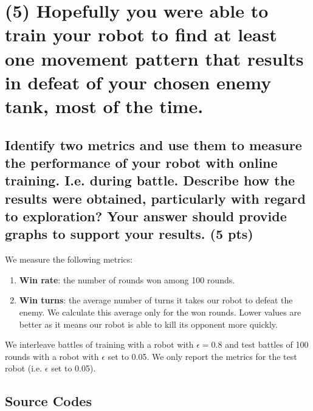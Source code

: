 \documentclass[a4paper,12pt]{article}
\begin{document}
\pagebreak
\section*{(5) Hopefully you were able to train your robot to find at least one movement pattern that results in defeat of your chosen enemy tank, most of the time.}

\subsection*{Identify two metrics and use them to measure the performance of your robot with online training. I.e. during battle. Describe how the results were obtained, particularly with regard to exploration? Your answer should provide graphs to support your results. (5 pts)}

We measure the following metrics:

\begin{enumerate}
\item \textbf{Win rate}: the number of rounds won among 100 rounds. 
\item \textbf{Win turns}: the average number of turns it takes our robot to defeat the enemy. We calculate this average only for the won rounds. Lower values are better as it means our robot is able to kill its opponent more quickly. 

\end{enumerate}

We interleave battles of training with a robot with $\epsilon = 0.8$ and test battles of 100 rounds with a robot with $\epsilon$ set to 0.05. We only report the metrics for the test robot (i.e. $\epsilon$ set to 0.05). 

\pagebreak
\begin{appendices}
\section{Source Codes}
%    
\end{appendices}
\end{document}
